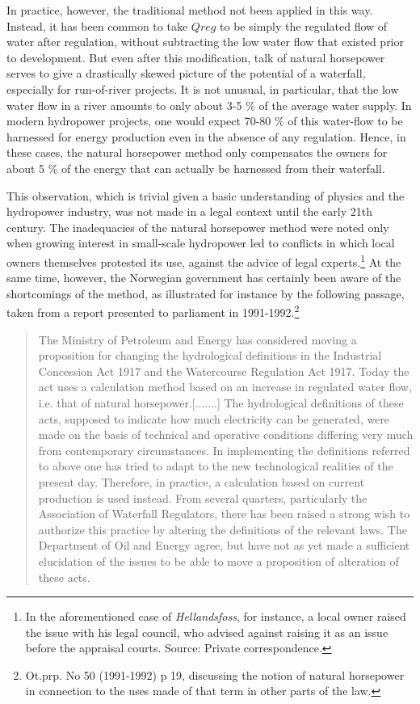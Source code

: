 In practice, however, the traditional method not been applied in this way. Instead, it has been common to take $Qreg$ to be simply the regulated flow of water after regulation, without subtracting the low water flow that existed prior to development. But even after this modification, talk of natural horsepower serves to give a drastically skewed picture of the potential of a waterfall, especially for run-of-river projects. It is not unusual, in particular, that the low water flow in a river amounts to only about 3-5 \% of the average water supply. In modern hydropower projects, one would expect 70-80 \% of this water-flow to be harnessed for energy production even in the absence of any regulation. Hence, in these cases, the natural horsepower method only compensates the owners for about 5 \% of the energy that can actually be harnessed from their waterfall.

This observation, which is trivial given a basic understanding of physics and the hydropower industry, was not made in a legal context until the early 21th century. The inadequacies of the natural horsepower method were noted only when growing interest in small-scale hydropower led to conflicts in which local owners themselves protested its use, against the advice of legal experts.\footnote{In the aforementioned case of {\it Hellandsfoss}, for instance, a local owner raised the issue with his legal council, who advised against raising it as an issue before the appraisal courts. Source: Private correspondence.}
At the same time, however, the Norwegian government has certainly been aware of the shortcomings of the method, as illustrated for instance by the following passage, taken from a report presented to parliament in 1991-1992.\footnote{Ot.prp. No 50 (1991-1992) p 19, discussing the notion of natural horsepower in connection to the uses made of that term in other parts of the law.}

\begin{quote}
The Ministry of Petroleum and Energy has considered moving a proposition for changing the hydrological definitions in the Industrial Concession Act 1917 and the Watercourse Regulation Act 1917. Today the act uses a calculation method based on an increase in regulated water flow, i.e. that of natural horsepower.[.......] The hydrological definitions of these acts, supposed to indicate how much electricity can be generated, were made on the basis of technical and operative conditions differing very much from contemporary circumstances. In implementing the definitions referred to above one has tried to adapt to the new technological realities of the present day. Therefore, in practice, a calculation based on current production is used instead. From several quarters, particularly the Association of Waterfall Regulators, there has been raised a strong wish to authorize this practice by altering the definitions of the relevant laws. The Department of Oil and Energy agree, but have not as yet made a sufficient elucidation of the issues to be able to move a proposition of alteration of these acts.
\end{quote}

